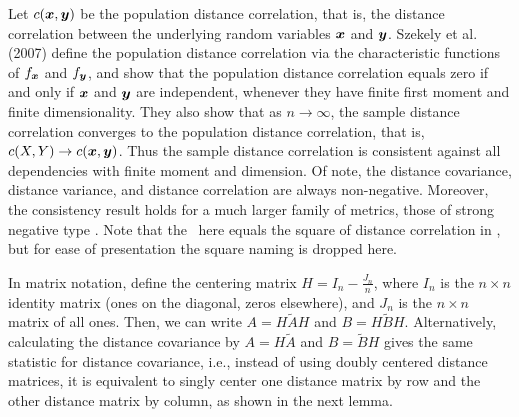 \documentclass[11pt]{extarticle}
\begin{document}
Let $c(\boldsymbol{x},\boldsymbol{y})$ be the population distance correlation, that is, the distance correlation between the underlying random variables $\boldsymbol{x}$ and $\boldsymbol{y}$. Szekely et al. (2007)  define the population distance correlation  via the characteristic functions of $f_{\boldsymbol{x}}$ and $f_{\boldsymbol{y}}$, and show that the population distance correlation equals zero if and only if $\boldsymbol{x}$ and $\boldsymbol{y}$ are independent, whenever they have finite first moment and finite dimensionality.
They also show that  as $n \rightarrow \infty$, the sample distance correlation converges to the population distance correlation, that is, $c(X,Y) \rightarrow c(\boldsymbol{x},\boldsymbol{y})$. Thus the sample distance correlation is consistent against all dependencies with finite moment and dimension.
Of note, the distance covariance, distance variance, and distance correlation are always non-negative.  Moreover,  the consistency result holds for a much larger family of metrics, those of strong negative type  \cite{Lyons2013}.
Note that the \Dcorr~here equals the square of distance correlation in \cite{SzekelyRizzoBakirov2007}, but for ease of presentation the square naming is dropped here.

In matrix notation, define the centering matrix $H=I_{n}-\frac{J_{n}}{n}$, where $I_n$ is the $n \times n$ identity matrix (ones on the diagonal, zeros elsewhere), and $J_n$ is the $n \times n$ matrix of all ones. Then, we can write  $A=H\tilde{A}H$ and $B=H\tilde{B}H$.
%
Alternatively, calculating the distance covariance by $A=H\tilde{A}$ and $B=\tilde{B}H$ gives the same statistic for distance covariance, i.e., instead of using doubly centered distance matrices, it is equivalent to singly center one distance matrix by row and the other distance matrix by column, as shown in the next lemma.
\end{document}
